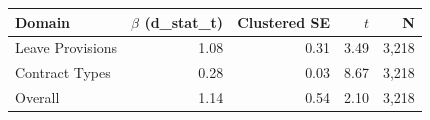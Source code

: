 \begin{tabular}{lrrrr}
    \hline\hline
    Domain & $\beta$ (d\_stat\_t) & Clustered SE & $t$ & N \\
    \hline
    Leave Provisions & 1.08 & 0.31 & 3.49 & 3,218 \\
    Contract Types & 0.28 & 0.03 & 8.67 & 3,218 \\
    Overall & 1.14 & 0.54 & 2.10 & 3,218 \\
    \hline\hline
\end{tabular}
